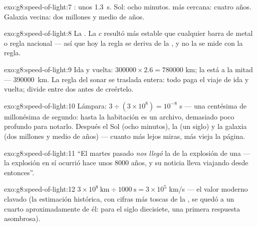 \begin{solution}{exo:g8:speed-of-light:7}
: unos \qty{1.3}{s}. Sol: ocho minutos.  más
cercana: cuatro años. Galaxia vecina: dos millones y medio de años.
\end{solution}

\begin{solution}{exo:g8:speed-of-light:8}
La . La  $c$ resultó más estable que
cualquier barra de metal o regla nacional --- así que hoy la regla se
deriva de la , y no la  se mide con la regla.
\end{solution}

\begin{solution}{exo:g8:speed-of-light:9}
Ida y vuelta: $300000 \times 2.6 = 780000$ km; la  está a la
mitad --- \qty{390000}{km}. La regla del sonar se traslada entera: todo
 paga el viaje de ida y vuelta; divide entre dos antes de
creértelo.
\end{solution}

\begin{solution}{exo:g8:speed-of-light:10}
Lámpara: $3 \div (3 \times 10^{8}) = 10^{-8}$ s --- una centésima de
millonésima de segundo: hasta la habitación es un archivo, demasiado
poco profundo para notarlo. Después el Sol (ocho minutos), la
 (un siglo) y la galaxia (dos millones y medio de años) ---
cuanto más lejos miras, más vieja la página.
\end{solution}

\begin{solution}{exo:g8:speed-of-light:11}
``El martes pasado \emph{nos llegó} la  de la explosión de una
 --- la explosión en sí ocurrió hace unos $8000$ años, y su
noticia lleva viajando desde entonces''.
\end{solution}

\begin{solution}{exo:g8:speed-of-light:12}
$3 \times 10^{8}\ \text{km} \div 1000\ \text{s} = 3 \times 10^{5}$
\unit{km/s} --- el valor moderno clavado (la estimación histórica, con
cifras más toscas de la , se quedó a un cuarto
aproximadamente de él: para el siglo diecisiete, una primera respuesta
asombrosa).
\end{solution}

